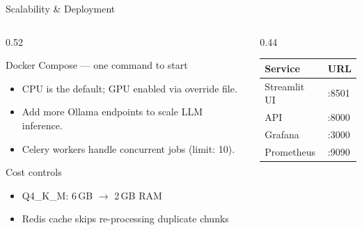 \documentclass[aspectratio=169]{beamer}
\begin{document}
\begin{frame}{Scalability \& Deployment}
  \begin{columns}[T,onlytextwidth]
    \begin{column}{0.52\textwidth}
      \begin{block}{Docker Compose --- one command to start}
        \begin{itemize}
          \item CPU is the default; GPU enabled via override file.
          \item Add more Ollama endpoints to scale LLM inference.
          \item Celery workers handle concurrent jobs (limit: 10).
        \end{itemize}
      \end{block}
      \begin{block}{Cost controls}
        \begin{itemize}
          \item Q4\_K\_M: 6\,GB $\rightarrow$ 2\,GB RAM
          \item Redis cache skips re-processing duplicate chunks
        \end{itemize}
      \end{block}
    \end{column}
    \begin{column}{0.44\textwidth}
      \begin{tabular}{@{}ll@{}}
        \toprule
        Service & URL \\
        \midrule
        Streamlit UI & :8501 \\
        API          & :8000 \\
        Grafana      & :3000 \\
        Prometheus   & :9090 \\
        \bottomrule
      \end{tabular}
    \end{column}
  \end{columns}
\end{frame}
\end{document}
